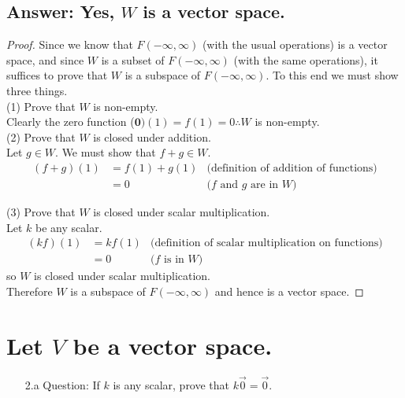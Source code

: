 \documentclass[12pt]{article}
\begin{document}
\subsection{Answer: Yes, $W$ is a vector space.}
\begin{proof}
        Since we know that $F(-\infty, \infty)$ (with the usual operations) is a vector space,
        and since $W$ is a subset of $F(-\infty, \infty)$ (with the same operations),
        it suffices to prove that $W$ is a subspace of $F(-\infty, \infty)$. To this end we must show three things.\\

        (1) Prove that $W$ is non-empty.\\
        Clearly the zero function ($\mathbf{0})(1)=f(1)=0\therefore W$ is non-empty.\\

        (2) Prove that $W$ is closed under addition.\\
        Let $g \in W$. We must show that $f+g \in W$.
        \begin{align*}
                (f+g)(1) & = f(1) + g(1) & \textrm{(definition of addition of functions)} \\
                         & = 0           & \textrm{($f$ and $g$ are in $W$)}
        \end{align*}

        (3) Prove that $W$ is closed under scalar multiplication. \\
        Let $k$ be any scalar.
        \begin{align*}
                (kf)(1) & = kf(1) & \textrm{(definition of scalar multiplication on functions)} \\
                        & = 0     & \textrm{($f$ is in $W$)}
        \end{align*}
        so $W$ is closed under scalar multiplication.\\

        Therefore $W$ is a subspace of $F(-\infty, \infty)$ and hence is a vector space.
\end{proof}
\pagebreak
\section{Let $V$ be a vector space.}
\begin{enumerate}
        \item [2.a]Question: If $k$ is any scalar, prove that $k\vec{0} = \vec{0}$.
\end{enumerate}
\end{document}
